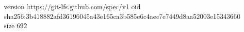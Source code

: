version https://git-lfs.github.com/spec/v1
oid sha256:3b418882afd36196045a43e165ca3b585e6c4aee7e7449d8aa52003e15343660
size 692

